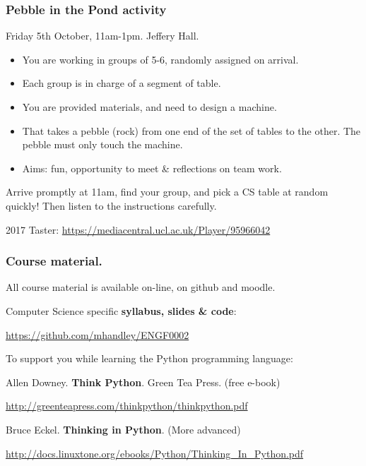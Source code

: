 \documentclass{beamer} %
\newcommand\emc[1]{\textcolor{midred}{\textbf{#1}}}
\begin{document}
\begin{frame}
\frametitle{Pebble in the Pond activity} 

Friday 5th October, 11am-1pm. Jeffery Hall.

\begin{itemize}
	\item You are working in groups of 5-6, randomly assigned on arrival.
	\item Each group is in charge of a segment of table.
	\item You are provided materials, and need to design a machine.
	\item That takes a pebble (rock) from one end of the set of tables to the other. The pebble must only touch the machine.
	\item Aims: fun, opportunity to meet \& reflections on team work.
\end{itemize}


Arrive promptly at 11am, find your group, and pick a CS table at random quickly! Then listen to the instructions carefully.

\vspace{0.24in}
2017 Taster: \url{https://mediacentral.ucl.ac.uk/Player/95966042}
\end{frame}

\begin{frame}
\frametitle{Course material.} 

All course material is available on-line, on github and moodle.

\vspace{7mm}
Computer Science specific \emc{syllabus, slides \& code}: 

\url{https://github.com/mhandley/ENGF0002}

\vspace{7mm}
To support you while learning the Python programming language:

\vspace{2mm}
Allen Downey. \emc{Think Python}. Green Tea Press. (free e-book)

{\small \url{http://greenteapress.com/thinkpython/thinkpython.pdf} }

\vspace{2mm}
Bruce Eckel. \emc{Thinking in Python}. (More advanced)

{\small \url{http://docs.linuxtone.org/ebooks/Python/Thinking_In_Python.pdf} }


\end{frame}
\end{document}
